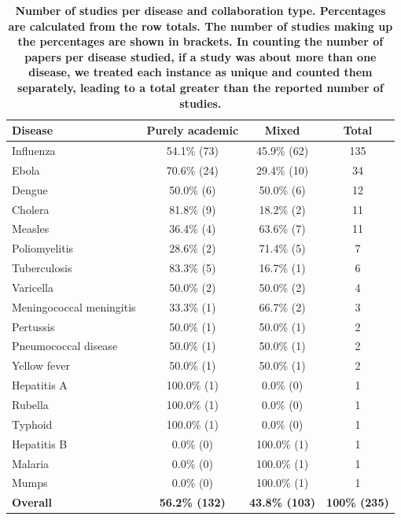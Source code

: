 \documentclass[10pt,letterpaper]{article}
\begin{document}
\begin{table}[!h]
	\setlength\arrayrulewidth{1pt} 
	\centering
	\caption{\bf Number of studies per disease and collaboration type. Percentages are calculated from the row totals. The number of studies making up the percentages are shown in brackets. In counting the number of papers per disease studied, if a study was about more than one disease, we treated each instance as unique and counted them separately, leading to a total greater than the reported number of studies.}
	\begin{tabular}{|l c c c|}
		\hline
		\textbf{Disease}         & \textbf{Purely academic} & \textbf{Mixed} & \textbf{Total} \\ \hline
		Influenza                & 54.1\% (73)     & 45.9\% (62) & 135   \\ \hline
		Ebola                    & 70.6\% (24)     & 29.4\% (10) & 34    \\ \hline
		Dengue                   & 50.0\% (6)      & 50.0\% (6)  & 12    \\ \hline
		Cholera                  & 81.8\% (9)      & 18.2\% (2)  & 11    \\ \hline
		Measles                  & 36.4\% (4)      & 63.6\% (7)  & 11    \\ \hline
		Poliomyelitis            & 28.6\% (2)      & 71.4\% (5)  & 7     \\ \hline
		Tuberculosis             & 83.3\% (5)      & 16.7\% (1)  & 6     \\ \hline
		Varicella                & 50.0\% (2)      & 50.0\% (2)  & 4     \\ \hline
		Meningococcal meningitis & 33.3\% (1)      & 66.7\% (2)  & 3     \\ \hline
		Pertussis                & 50.0\% (1)      & 50.0\% (1)  & 2     \\ \hline
		Pneumococcal disease     & 50.0\% (1)      & 50.0\% (1)  & 2     \\ \hline
		Yellow fever             & 50.0\% (1)      & 50.0\% (1)  & 2     \\ \hline
		Hepatitis A             & 100.0\% (1)     & 0.0\% (0)   & 1     \\ \hline
		Rubella                  & 100.0\% (1)     & 0.0\% (0)   & 1     \\ \hline
		Typhoid                  & 100.0\% (1)     & 0.0\% (0)   & 1     \\ \hline
		Hepatitis B              & 0.0\% (0)       & 100.0\% (1) & 1     \\ \hline
		Malaria                  & 0.0\% (0)       & 100.0\% (1) & 1     \\ \hline
		Mumps                    & 0.0\% (0)       & 100.0\% (1) & 1    \\ \hline \rowcolor{gray!20}
		\textbf{Overall}			&	\textbf{56.2\% (132)}   			& \textbf{43.8\% (103)}   & \textbf{100\% (235)} \\
		\hline
	\end{tabular}
	\label{studies_per_disease_and_collaboration_type}
\end{table}
\end{document}
